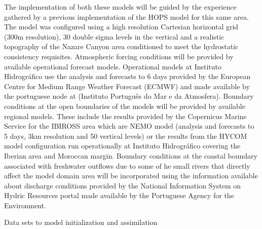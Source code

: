 The implementation of both these models will be guided by the experience
gathered by a previous implementation of the HOPS model for this same
area. The model was configured using a high resolution Cartesian
horizontal grid (300m resolution), 30 double sigma levels in the
vertical and a realistic topography of the Nazare Canyon area
conditioned to meet the hydrostatic consistency requisites.  Atmospheric
forcing conditions will be provided by available operational forecast
models. Operational models at Instituto Hidrográfico use the analysis
and forecasts to 6 days provided by the European Centre for Medium Range
Weather Forecast (ECMWF) and made available by the portuguese node at
(Instituto Português do Mar e da Atmosfera).  Boundary conditions at the
open boundaries of the models will be provided by available regional
models. These include the results provided by the Copernicus Marine
Service for the IBIROSS area which are NEMO model (analysis and
forecasts to 5 days, 3km resolution and 50 vertical levels) or the
results from the HYCOM model configuration run operationally at
Instituto Hidrográfico covering the Iberian area and Moroccan margin.
Boundary conditions at the coastal boundary associated with freshwater
outflows due to some of he small rivers that directly affect the model
domain area will be incorporated using the information available about
discharge conditions provided by the National Information System on
Hydric Resources portal made available by the Portuguese Agency for the
Environment.

Data sets to model initialization and assimilation

